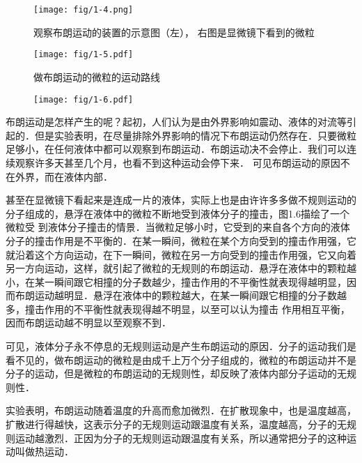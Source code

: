 \begin{figure}[htp]
\centering
\texttt{[image: fig/1-4.png]}
\caption{观察布朗运动的装置的示意图（左），
右图是显微镜下看到的微粒
}
\end{figure}

\begin{figure}[htp]\centering
	\begin{minipage}[t]{0.48\textwidth}
		\centering
\texttt{[image: fig/1-5.pdf]}
\caption{做布朗运动的微粒的运动路线
}
	\end{minipage}
	\begin{minipage}[t]{0.48\textwidth}
		\centering
\texttt{[image: fig/1-6.pdf]}
\caption{}
	\end{minipage}
\end{figure}






布朗运动是怎样产生的呢？起初，人们认为是由外界影响如震动、液体的对流等引起的．但是实验表明，在尽量排除外界影响的情况下布朗运动仍然存在．只要微粒足够小，在任何液体中都可以观察到布朗运动．布朗运动决不会停止．我们可以连续观察许多天甚至几个月，也看不到这种运动会停下来．
可见布朗运动的原因不在外界，而在液体内部．

甚至在显微镜下看起来是连成一片的液体，实际上也是由许许多多做不规则运动的分子组成的，悬浮在液体中的微粒不断地受到液体分子的撞击，图1.6描绘了一个微粒受
到液体分子撞击的情景．当微粒足够小时，它受到的来自各个方向的液体分子的撞击作用是不平衡的．在某一瞬间，微粒在某个方向受到的撞击作用强，它就沿着这个方向运动，在下一瞬间，微粒在另一方向受到的撞击作用强，它又向着另一方向运动，这样，就引起了微粒的无规则的布朗运动．悬浮在液体中的颗粒越小，在某一瞬间跟它相撞的分子数越少，撞击作用的不平衡性就表现得越明显，因而布朗运动越明显．悬浮在液体中的颗粒越大，在某一瞬间跟它相撞的分子数越多，撞击作用的不平衡性就表现得越不明显，以至可以认为撞击
作用相互平衡，因而布朗运动越不明显以至观察不到．

可见，液体分子永不停息的无规则运动是产生布朗运动的原因．分子的运动我们是看不见的，做布朗运动的微粒是由成千上万个分子组成的，微粒的布朗运动并不是分子的运动，但是微粒的布朗运动的无规则性，却反映了液体内部分子运动的无规则性．

实验表明，布朗运动随着温度的升高而愈加微烈．在扩散现象中，也是温度越高，扩散进行得越快，这表示分子的无规则运动跟温度有关系，温度越高，分子的无规则运动越激烈．正因为分子的无规则运动跟温度有关系，所以通常把分子的这种运动叫做热运动．


